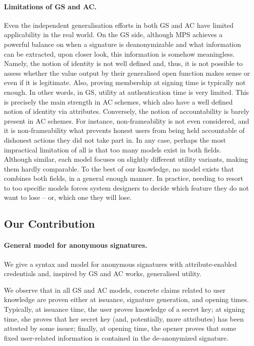 \paragraph{Limitations of GS and AC.} %
Even the independent generalisation efforts in both GS and AC
have limited applicability in the real world. On the GS side, although MPS
achieves a powerful balance on when a signature is deanonymizable and what
information can be extracted, upon closer look, this information is somehow
meaningless. Namely, the notion of identity is not well defined and, thus, it is
not possible to assess whether the value output by their generalised open
function makes sense or even if it is legitimate. Also, proving membership at
signing time is typically not enough. In other words, in GS,
utility at authentication time is very limited. This is precisely the main
strength in AC schemes, which also have a well defined notion of identity via
attributes. Conversely, the notion of accountability  is barely present in AC
schemes. For instance, non-frameability is not even considered, and it is
non-frameability what prevents honest users from being held accountable of
dishonest actions they did not take part in.
%
In any case, perhaps the most impractical limitation of all is that too many
models exist in both fields. Although similar, each model focuses on slightly
different utility variants, making them hardly comparable. To the best of our
knowledge, no model exists that combines both fields, in a general enough
manner. In practice, needing to resort to too specific models forces system
designers to decide which feature they do not want to lose -- or, which one they
will lose.

\subsection{Our Contribution} 

\paragraph{General model for anonymous signatures.} %
We give a syntax and model for anonymous signatures with attribute-enabled
credentials and, inspired by GS and AC works, generalised utility.

We observe that in all GS and AC models, concrete
claims related to user knowledge are proven either at issuance, signature
generation, and opening times. Typically, at issuance time, the user proves
knowledge of a secret key; at signing time, she proves that her secret key (and,
potentially, more attributes) has been attested by some issuer; finally, at
opening time, the opener proves that some fixed user-related information is
contained in the de-anonymized signature.

